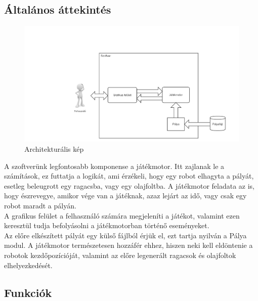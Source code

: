 


\subsection{Általános áttekintés}

\begin{figure}[ht!]
	\centering
	\includegraphics[width=180mm, center]{./chapters/chapter02/dia1.jpg}
	\caption{Architekturális kép \label{overflow}}
\end{figure}

A szoftverünk legfontosabb komponense a játékmotor. Itt zajlanak le a számítások, ez futtatja a logikát, ami érzékeli, hogy egy robot elhagyta a pályát, esetleg beleugrott egy ragacsba, vagy egy olajfoltba. A játékmotor feladata az is, hogy észrevegye, amikor vége van a játéknak, azaz lejárt az idő, vagy csak egy robot maradt a pályán. \\

A grafikus felület a felhasználó számára megjeleníti a játékot, valamint ezen keresztül tudja befolyásolni a játékmotorban történő eseményeket. \\

Az előre elkészített pályát egy külső fájlból érjük el, ezt tartja nyilván a Pálya modul. A játékmotor természetesen hozzáfér ehhez, hiszen neki kell eldöntenie a robotok kezdőpozícióját, valamint az előre legenerált ragacsok és olajfoltok elhelyezkedését. \\

\subsection{Funkciók}

